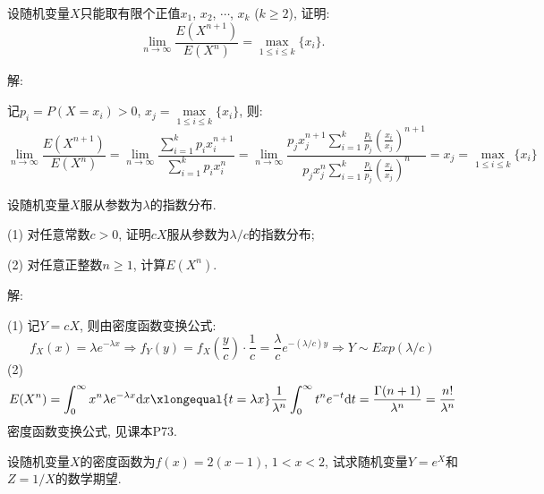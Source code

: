 \documentclass[standard]{ExBook}
\renewenvironment{shaded}{%
  \def\FrameCommand{\fboxsep=\FrameSep \colorbox{shadecolor}}%
  \MakeFramed{\advance\hsize-\width \FrameRestore}%
}{%
  \endMakeFramed
}
\begin{document}
\begin{qitems}
    \begin{bbox}
    \begin{shaded}
        \qitem
设随机变量$X$只能取有限个正值$x_1$, $x_2$, $\cdots$, $x_k$ ($k\geq 2$), 证明:
$$\lim\limits_{n\to\infty}\displaystyle\frac{E(X^{n+1})}{E(X^{n})}=\max\limits_{1\leq i\leq k}\{x_i\}.$$
    \end{shaded}
    \end{bbox}

\vspace{\dimexpr2.5cm-5em\relax}

解: 

记$p_i=P(X=x_i)>0$, $x_j=\max\limits_{1\leq i\leq k}\{x_i\}$, 则:
$$\lim\limits_{n\to\infty}\displaystyle\frac{E(X^{n+1})}{E(X^{n})}=\lim\limits_{n\to\infty}\frac{\sum\limits_{i=1}^{k}p_{i}x_{i}^{n+1}}{\sum\limits_{i=1}^{k}p_{i}x_{i}^{n}}=\lim\limits_{n\to\infty}\frac{\displaystyle p_{j} x_{j}^{n+1}\sum\limits_{i=1}^{k}\frac{p_i}{p_j}\left(\frac{x_i}{x_j}\right)^{n+1}}{\displaystyle p_{j} x_{j}^{n}\sum\limits_{i=1}^{k}\frac{p_i}{p_j}\left(\frac{x_i}{x_j}\right)^{n}}=x_j=\max\limits_{1\leq i\leq k}\{x_i\}$$

\vspace{2.5cm-5em}

    \begin{bbox}
    \begin{shaded}
        \qitem
设随机变量$X$服从参数为$\lambda$的指数分布.

(1) 对任意常数$c>0$, 证明$cX$服从参数为$\lambda/c$的指数分布;

(2) 对任意正整数$n\geq 1$, 计算$E(X^n)$.
    \end{shaded}
    \end{bbox}

\vspace{\dimexpr2.5cm-5em\relax}

解:

(1) 记$Y=cX$, 则由密度函数变换公式:
$$f_{X}(x)=\lambda e^{-\lambda x} \Longrightarrow f_{Y}(y)=f_{X}(\frac{y}{c})\cdot\frac{1}{c}=\frac{\lambda}{c}e^{-(\lambda/c)y} \Longrightarrow Y\sim Exp(\lambda/c)$$
(2)
$$E(X^n)=\displaystyle\int_{0}^{\infty}x^n \lambda e^{-\lambda x}\mathrm{d}x \xlongequal{t=\lambda x} \frac{1}{\lambda^n}\int_{0}^{\infty}t^n e^{-t}\mathrm{d}t=\frac{\Gamma(n+1)}{\lambda^n}=\frac{n!}{\lambda^n}$$
\textcolor{themeColor}{\selectfont {} 密度函数变换公式, 见课本P73.}

\vspace{2.5cm-5em}

    \begin{bbox}
    \begin{shaded}
        \qitem
设随机变量$X$的密度函数为$f(x)=2(x-1)$, $1<x<2$, 试求随机变量$Y=e^{X}$和$Z=1/X$的数学期望.
    \end{shaded}
    \end{bbox}


\end{qitems}
\end{document}
